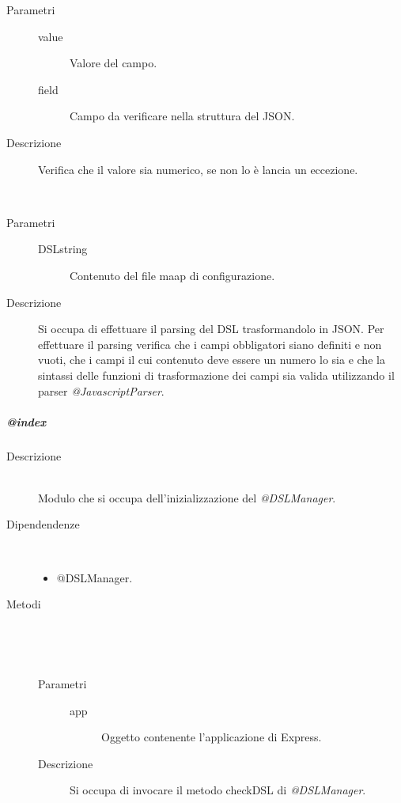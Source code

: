 \begin{description}
\begin{mldescription}
 \begin{description}
     		\item[Parametri] \hfill
     			\begin{description}
     				\item[value]
     				 Valore del campo.
     				\item[field]
     				 Campo da verificare nella struttura del JSON.
     			\end{description}
     		\item[Descrizione]
     		Verifica che il valore sia numerico, se non lo è lancia un eccezione.
   \end{description}
  \hfill \\
 \begin{description}
     		\item[Parametri] \hfill
     			\begin{description}
     				\item[DSLstring]
     				Contenuto del file maap di configurazione.
     			\end{description}
     		\item[Descrizione]
     		Si occupa di effettuare il parsing del DSL trasformandolo in JSON. Per effettuare il parsing verifica che i campi obbligatori siano definiti e non vuoti, che i campi il cui contenuto deve essere un numero lo sia e che la sintassi delle funzioni di trasformazione dei campi sia valida utilizzando il parser \textit{@JavascriptParser}.
   \end{description}
 \end{mldescription}
 
\end{description}
\subparagraph{@index}
\begin{description}
 \item[Descrizione] \hfill \\
  Modulo che si occupa dell'inizializzazione del \textit{@DSLManager}.
 \item[Dipendendenze] \hfill \\
 \begin{itemize}
  \item{@DSLManager}.
 \end{itemize}
  
 \item[Metodi] \hfill \\
 \begin{mldescription}
 \hfill \\
 \begin{description}
     		\item[Parametri] \hfill
     			\begin{description}
     				\item[app]
     				Oggetto contenente l'applicazione di Express.
     			\end{description}
     		\item[Descrizione]
     		Si occupa di invocare il metodo checkDSL di \textit{@DSLManager}.
   \end{description}
 \end{mldescription}
 
\end{description}
